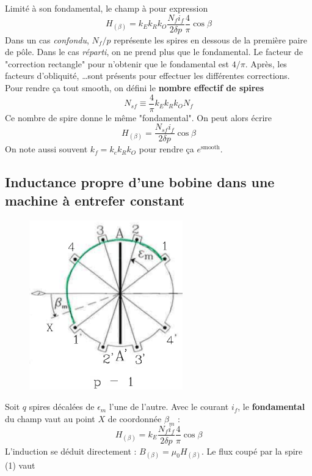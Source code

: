 	Limité à son fondamental, le champ à pour expression
	\begin{equation}
	H_{(\beta)} = k_Ek_Rk_O\dfrac{N_fi_f}{2\delta p}\dfrac{4}{\pi}\cos\beta
	\end{equation}
	Dans un cas \textit{confondu}, $N_f/p$ représente les spires en dessous de la 
	première paire de pôle. Dans le cas \textit{réparti}, on ne prend plus que le 
	fondamental. Le facteur de "correction rectangle" pour n'obtenir que le fondamental 
	est $4/\pi$. Après, les facteurs d'obliquité, \dots sont présents pour effectuer 
	les différentes corrections.\\
	Pour rendre ça tout smooth, on défini le \textbf{nombre effectif de spires}
	\begin{equation}
	N_{sf} \equiv \dfrac{4}{\pi}k_Ek_Rk_ON_f
	\end{equation}
	Ce nombre de spire donne le même "fondamental". On peut alors écrire
	\begin{equation}
	H_{(\beta)} = \dfrac{N_{sf}i_f}{2\delta p}\cos\beta
	\end{equation}
	On note aussi souvent $k_f=k_ek_Rk_O$ pour rendre ça $e^{\text{smooth}}$.
	
	
	\subsection{Inductance propre d'une bobine dans une machine à entrefer constant}
	\begin{figure}
	\vspace{-8mm}
	\includegraphics[scale=0.45]{ch5/image12.png}
	\end{figure}
	Soit $q$ spires décalées de $\epsilon_m$ l'une de l'autre. Avec le courant $i_f$, 
	le \textbf{fondamental} du champ vaut au point $X$ de coordonnée $\beta_m$ :
	\begin{equation}
	H_{(\beta)} = k_E\dfrac{N_fi_f}{2\delta p}\dfrac{4}{\pi}\cos\beta
	\end{equation}
	L'induction se déduit directement : $B_{(\beta)} = \mu_0H_{(\beta)}$. Le flux 
	coupé par la spire (1) vaut \\
	\ \\
	
